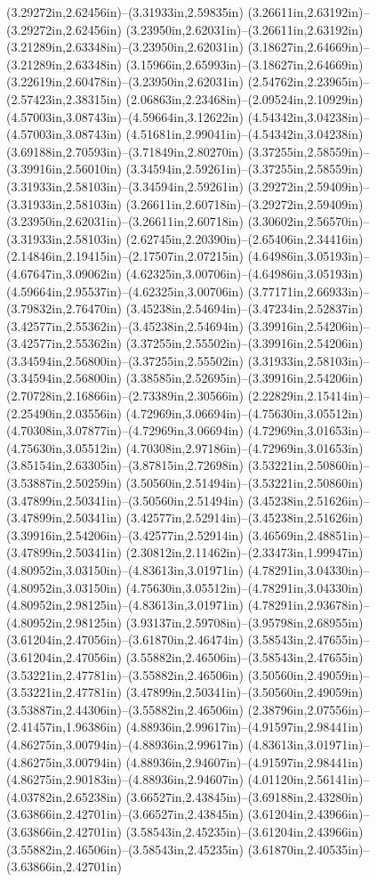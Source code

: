(3.29272in,2.62456in)--(3.31933in,2.59835in) (3.26611in,2.63192in)--(3.29272in,2.62456in) (3.23950in,2.62031in)--(3.26611in,2.63192in) (3.21289in,2.63348in)--(3.23950in,2.62031in) (3.18627in,2.64669in)--(3.21289in,2.63348in) (3.15966in,2.65993in)--(3.18627in,2.64669in) (3.22619in,2.60478in)--(3.23950in,2.62031in) (2.54762in,2.23965in)--(2.57423in,2.38315in) (2.06863in,2.23468in)--(2.09524in,2.10929in) (4.57003in,3.08743in)--(4.59664in,3.12622in) (4.54342in,3.04238in)--(4.57003in,3.08743in) (4.51681in,2.99041in)--(4.54342in,3.04238in) (3.69188in,2.70593in)--(3.71849in,2.80270in) (3.37255in,2.58559in)--(3.39916in,2.56010in) (3.34594in,2.59261in)--(3.37255in,2.58559in) (3.31933in,2.58103in)--(3.34594in,2.59261in) (3.29272in,2.59409in)--(3.31933in,2.58103in) (3.26611in,2.60718in)--(3.29272in,2.59409in) (3.23950in,2.62031in)--(3.26611in,2.60718in) (3.30602in,2.56570in)--(3.31933in,2.58103in) (2.62745in,2.20390in)--(2.65406in,2.34416in) (2.14846in,2.19415in)--(2.17507in,2.07215in) (4.64986in,3.05193in)--(4.67647in,3.09062in) (4.62325in,3.00706in)--(4.64986in,3.05193in) (4.59664in,2.95537in)--(4.62325in,3.00706in) (3.77171in,2.66933in)--(3.79832in,2.76470in) (3.45238in,2.54694in)--(3.47234in,2.52837in) (3.42577in,2.55362in)--(3.45238in,2.54694in) (3.39916in,2.54206in)--(3.42577in,2.55362in) (3.37255in,2.55502in)--(3.39916in,2.54206in) (3.34594in,2.56800in)--(3.37255in,2.55502in) (3.31933in,2.58103in)--(3.34594in,2.56800in) (3.38585in,2.52695in)--(3.39916in,2.54206in) (2.70728in,2.16866in)--(2.73389in,2.30566in) (2.22829in,2.15414in)--(2.25490in,2.03556in) (4.72969in,3.06694in)--(4.75630in,3.05512in) (4.70308in,3.07877in)--(4.72969in,3.06694in) (4.72969in,3.01653in)--(4.75630in,3.05512in) (4.70308in,2.97186in)--(4.72969in,3.01653in) (3.85154in,2.63305in)--(3.87815in,2.72698in) (3.53221in,2.50860in)--(3.53887in,2.50259in) (3.50560in,2.51494in)--(3.53221in,2.50860in) (3.47899in,2.50341in)--(3.50560in,2.51494in) (3.45238in,2.51626in)--(3.47899in,2.50341in) (3.42577in,2.52914in)--(3.45238in,2.51626in) (3.39916in,2.54206in)--(3.42577in,2.52914in) (3.46569in,2.48851in)--(3.47899in,2.50341in) (2.30812in,2.11462in)--(2.33473in,1.99947in) (4.80952in,3.03150in)--(4.83613in,3.01971in) (4.78291in,3.04330in)--(4.80952in,3.03150in) (4.75630in,3.05512in)--(4.78291in,3.04330in) (4.80952in,2.98125in)--(4.83613in,3.01971in) (4.78291in,2.93678in)--(4.80952in,2.98125in) (3.93137in,2.59708in)--(3.95798in,2.68955in) (3.61204in,2.47056in)--(3.61870in,2.46474in) (3.58543in,2.47655in)--(3.61204in,2.47056in) (3.55882in,2.46506in)--(3.58543in,2.47655in) (3.53221in,2.47781in)--(3.55882in,2.46506in) (3.50560in,2.49059in)--(3.53221in,2.47781in) (3.47899in,2.50341in)--(3.50560in,2.49059in) (3.53887in,2.44306in)--(3.55882in,2.46506in) (2.38796in,2.07556in)--(2.41457in,1.96386in) (4.88936in,2.99617in)--(4.91597in,2.98441in) (4.86275in,3.00794in)--(4.88936in,2.99617in) (4.83613in,3.01971in)--(4.86275in,3.00794in) (4.88936in,2.94607in)--(4.91597in,2.98441in) (4.86275in,2.90183in)--(4.88936in,2.94607in) (4.01120in,2.56141in)--(4.03782in,2.65238in) (3.66527in,2.43845in)--(3.69188in,2.43280in) (3.63866in,2.42701in)--(3.66527in,2.43845in) (3.61204in,2.43966in)--(3.63866in,2.42701in) (3.58543in,2.45235in)--(3.61204in,2.43966in) (3.55882in,2.46506in)--(3.58543in,2.45235in) (3.61870in,2.40535in)--(3.63866in,2.42701in) 